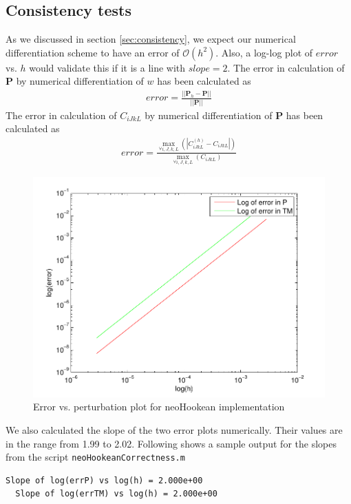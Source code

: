\message{ !name(p2.tex)}\documentclass[../main.tex]{subfiles}
\begin{document}
\subsection{Consistency tests}
As we discussed in section \ref{sec:consistency}, we expect our
numerical differentiation scheme to have an error of
$\mathcal{O}(h^2)$. Also, a log-log plot of $error$ vs. $h$ would
validate this if it is a line with $slope=2$. The error in calculation
of $\mathbf{P}$ by numerical differentiation of $w$ has been
calculated as
\begin{align*}
  error = \frac{||\mathbf{P}_h - \mathbf{P}||}{||\mathbf{P}||}
\end{align*}
The error in calculation of $C_{iJkL}$ by numerical differentiation
of $\mathbf{P}$ has been calculated as
\begin{align*}
  error =\frac{\underset{\forall i,J,k,L}{\max}\left(|C^{(h)}_{iJkL}-C_{iJkL}|\right)}{\underset{\forall i,J,k,L}{\max}\left(C_{iJkL}\right)}
\end{align*}
\begin{figure}[h]
  \centering
  \includegraphics{./img/neoHookConsistency.pdf}  
  \caption{Error vs. perturbation plot for neoHookean implementation}
  \label{fig:neoHcon}
\end{figure}
We also calculated the slope of the two error plots numerically. Their values are in the range from 1.99 to 2.02. Following shows a sample output for the slopes from the script \texttt{neoHookeanCorrectness.m}
\begin{lstlisting}[frame=single]
  Slope of log(errP) vs log(h) = 2.000e+00
  Slope of log(errTM) vs log(h) = 2.000e+00
\end{lstlisting}
\end{document}
